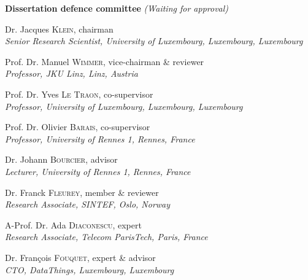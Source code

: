 \documentclass[12pt, twoside]{book}
\begin{document}
\begin{adjustwidth*}{1em}{1em}

\noindent
\textbf{\large Dissertation defence committee} \normalsize\textit{(Waiting for approval)}

\vspace{0.2cm}
\noindent
Dr. Jacques \textsc{Klein}, chairman\\
{\small \emph{Senior Research Scientist, University of Luxembourg, Luxembourg, Luxembourg}}


\vspace{0.2cm}
\noindent
Prof. Dr. Manuel \textsc{Wimmer}, vice-chairman \& reviewer\\
{\small \emph{Professor, JKU Linz, Linz, Austria}}

\vspace{0.2cm}
\noindent
Prof. Dr. Yves \textsc{Le Traon}, co-supervisor\\
{\small \emph{Professor, University of Luxembourg, Luxembourg, Luxembourg}}

\vspace{0.2cm}
\noindent
Prof. Dr. Olivier \textsc{Barais}, co-supervisor\\
{\small \emph{Professor, University of Rennes 1, Rennes, France}}

\vspace{0.2cm}
\noindent
Dr. Johann \textsc{Bourcier}, advisor\\
{\small \emph{Lecturer, University of Rennes 1, Rennes, France}}   

\vspace{0.2cm}
\noindent
Dr. Franck \textsc{Fleurey}, member \& reviewer\\
{\small \emph{Research Associate, SINTEF, Oslo, Norway}}

\vspace{0.2cm}
\noindent
A-Prof. Dr. Ada \textsc{Diaconescu}, expert\\
{\small \emph{Research Associate, Telecom ParisTech, Paris, France}}   

\vspace{0.2cm}
\noindent
Dr.  Fran\c{c}ois \textsc{Fouquet}, expert \& advisor\\
{\small \emph{CTO, DataThings, Luxembourg, Luxembourg}}   

\end{adjustwidth*}
\end{document}

